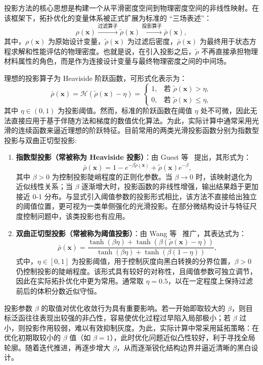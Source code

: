 投影方法的核心思想是构建一个从平滑密度空间到物理密度空间的非线性映射。在该框架下，拓扑优化的变量体系被正式扩展为标准的 “三场表述”：
\[
\rho(\boldsymbol{x}) \xrightarrow{\text{过滤算子}} \tilde{\rho}(\boldsymbol{x}) \xrightarrow{\text{投影算子}} \bar{\rho}(\boldsymbol{x}),
\]
其中，$\rho(\boldsymbol{x})$ 为原始设计变量，$\tilde{\rho}(\boldsymbol{x})$ 为过滤后密度，$\bar{\rho}(\boldsymbol{x})$ 为最终用于状态方程求解和性能评估的物理密度。也就是说，在引入投影之后，$\tilde{\rho}$ 不再直接承担物理材料属性的角色，而是作为连接设计变量与最终物理密度之间的中间场。

理想的投影算子为 Heaviside 阶跃函数，可形式化表示为：
\[
\bar{\rho}(\boldsymbol{x}) = \mathcal{H}(\tilde{\rho}(\boldsymbol{x}) - \eta) = 
\begin{cases}
	1, & \text{若 } \tilde{\rho}(\boldsymbol{x}) > \eta, \\
	0, & \text{若 } \tilde{\rho}(\boldsymbol{x}) \leq \eta,
\end{cases}
\]
其中 $\eta \in (0,1)$ 为投影阈值。然而，标准的阶跃函数在阈值 $\eta$ 处不可微，因此无法直接应用于基于伴随方法和梯度的数值优化算法。为此，实际计算中通常采用光滑的连续函数来逼近理想的阶跃特征。目前常用的两类光滑投影函数分别为指数型投影与双曲正切型投影:
\begin{enumerate}[{（}1{）}]
	\item \textbf{指数型投影（常被称为 Heaviside 投影）}：由 Guest 等~\cite{guestAchievingMinimumLength2004b} 提出，其形式为：
	\begin{equation} \label{eq:ch2_exponential_projection}
		\bar{\rho}(\boldsymbol{x}) = 1 - e^{-\beta \tilde{\rho}(\boldsymbol{x})} + \tilde{\rho}(\boldsymbol{x}) e^{-\beta},
	\end{equation}
	其中 $\beta > 0$ 为控制投影陡峭程度的正则化参数。当 $\beta \to 0$ 时，该映射退化为近似线性关系；当 $\beta$ 逐渐增大时，投影函数的非线性增强，输出结果趋于更加接近 0-1 分布。与显式引入阈值参数的投影形式相比，该方法不直接给出独立的阈值位置，更可视为一类单侧强化的光滑投影。在部分微结构设计与特征尺度控制问题中，该类投影也有应用。

	\item \textbf{双曲正切型投影（常被称为阈值投影）}：由 Wang 等~\cite{wangProjectionMethodsConvergence2011a} 推广，其表达式为：
	\begin{equation} \label{eq:ch2_tanh_projection}
		\bar{\rho}(\boldsymbol{x}) = \frac{\tanh(\beta \eta) + \tanh(\beta (\tilde{\rho}(\boldsymbol{x}) - \eta))}{\tanh(\beta \eta) + \tanh(\beta (1 - \eta))},
	\end{equation}
	式中，$\eta \in [0,1]$ 为投影阈值，用于控制灰度向黑白转换的分界位置，$\beta>0$ 仍控制投影的陡峭程度。该形式具有较好的对称性，且阈值参数可独立调节，因此在实际拓扑优化中更为常用。通常取 $\eta=0.5$，以在一定程度上保持过滤前后的体积分数近似守恒。
\end{enumerate}
投影参数 $\beta$ 的取值对优化收敛行为具有重要影响。若一开始即取较大的 $\beta$，则目标泛函往往表现出较强的非凸性，容易使优化过程过早陷入局部极小；若 $\beta$ 过小，则投影作用较弱，难以有效抑制灰度。为此，实际计算中常采用延拓策略：在优化初期取较小的 $\beta$ 值（如 $\beta=1$），此时优化问题近似凸性较好，利于寻找全局轮廓。随着迭代推进，再逐步增大 $\beta$，从而逐渐锐化结构边界并逼近清晰的黑白设计。

